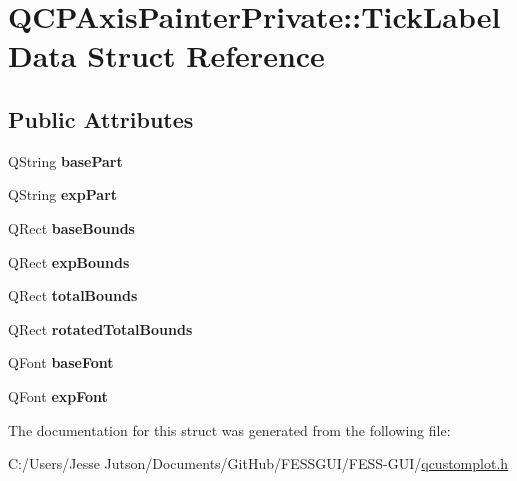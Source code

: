 \hypertarget{struct_q_c_p_axis_painter_private_1_1_tick_label_data}{}\section{Q\+C\+P\+Axis\+Painter\+Private\+:\+:Tick\+Label\+Data Struct Reference}
\label{struct_q_c_p_axis_painter_private_1_1_tick_label_data}
\subsection*{Public Attributes}
\begin{DoxyCompactItemize}
\item 
\hypertarget{struct_q_c_p_axis_painter_private_1_1_tick_label_data_ad65b76a5cafc412179a20b5d79809fc4}{}\label{struct_q_c_p_axis_painter_private_1_1_tick_label_data_ad65b76a5cafc412179a20b5d79809fc4} 
Q\+String {\bfseries base\+Part}
\item 
\hypertarget{struct_q_c_p_axis_painter_private_1_1_tick_label_data_a09692e4ea092137278b4ac051d5fdf2b}{}\label{struct_q_c_p_axis_painter_private_1_1_tick_label_data_a09692e4ea092137278b4ac051d5fdf2b} 
Q\+String {\bfseries exp\+Part}
\item 
\hypertarget{struct_q_c_p_axis_painter_private_1_1_tick_label_data_aac1047ae6ab8e9f5a42923082aabfff5}{}\label{struct_q_c_p_axis_painter_private_1_1_tick_label_data_aac1047ae6ab8e9f5a42923082aabfff5} 
Q\+Rect {\bfseries base\+Bounds}
\item 
\hypertarget{struct_q_c_p_axis_painter_private_1_1_tick_label_data_a6722d2bcefb93011e9dc42301b966846}{}\label{struct_q_c_p_axis_painter_private_1_1_tick_label_data_a6722d2bcefb93011e9dc42301b966846} 
Q\+Rect {\bfseries exp\+Bounds}
\item 
\hypertarget{struct_q_c_p_axis_painter_private_1_1_tick_label_data_afbb3163cf4c628914f1b703945419ea5}{}\label{struct_q_c_p_axis_painter_private_1_1_tick_label_data_afbb3163cf4c628914f1b703945419ea5} 
Q\+Rect {\bfseries total\+Bounds}
\item 
\hypertarget{struct_q_c_p_axis_painter_private_1_1_tick_label_data_aa4d38c5ea47c9184a78ee33ae7f1012e}{}\label{struct_q_c_p_axis_painter_private_1_1_tick_label_data_aa4d38c5ea47c9184a78ee33ae7f1012e} 
Q\+Rect {\bfseries rotated\+Total\+Bounds}
\item 
\hypertarget{struct_q_c_p_axis_painter_private_1_1_tick_label_data_a0d4958a706debaa8d19a9b65fc090d56}{}\label{struct_q_c_p_axis_painter_private_1_1_tick_label_data_a0d4958a706debaa8d19a9b65fc090d56} 
Q\+Font {\bfseries base\+Font}
\item 
\hypertarget{struct_q_c_p_axis_painter_private_1_1_tick_label_data_adc10767ebcb719d6927c012a38b9d933}{}\label{struct_q_c_p_axis_painter_private_1_1_tick_label_data_adc10767ebcb719d6927c012a38b9d933} 
Q\+Font {\bfseries exp\+Font}
\end{DoxyCompactItemize}


The documentation for this struct was generated from the following file\+:\begin{DoxyCompactItemize}
\item 
C\+:/\+Users/\+Jesse Jutson/\+Documents/\+Git\+Hub/\+F\+E\+S\+S\+G\+U\+I/\+F\+E\+S\+S-\/\+G\+U\+I/\hyperlink{qcustomplot_8h}{qcustomplot.\+h}\end{DoxyCompactItemize}
